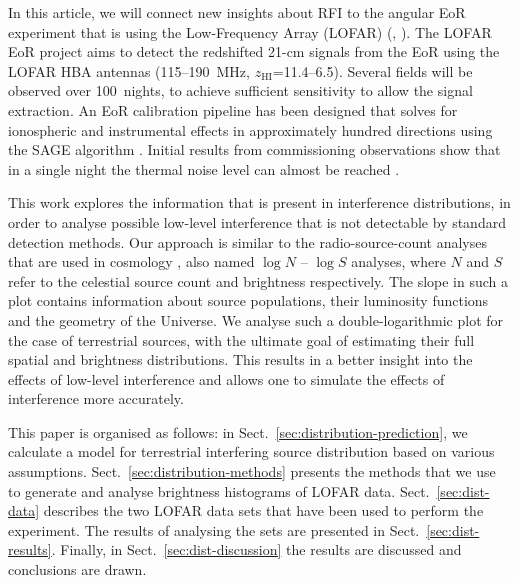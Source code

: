 \documentclass[useAMS,usenatbib]{mn2e}
\begin{document}
In this article, we will connect new insights about RFI to the angular EoR experiment that is using the Low-Frequency Array (LOFAR) (\citealt{de-bruyn-eor-ursi-2011}, \citealt{lofar-overview-2013}). The LOFAR EoR project aims to detect the redshifted 21-cm signals from the EoR using the LOFAR HBA antennas (115--190~MHz, $z_\textrm{HI}$=11.4--6.5). Several fields will be observed over 100~nights, to achieve sufficient sensitivity to allow the signal extraction. An EoR calibration pipeline has been designed that solves for ionospheric and instrumental effects in approximately hundred directions using the SAGE algorithm \citep{sage-calibration-ii}. Initial results from commissioning observations show that in a single night the thermal noise level can almost be reached \citep{ncp-eor-yatawatta}.

This work explores the information that is present in interference distributions, in order to analyse possible low-level interference that is not detectable by standard detection methods. Our approach is similar to the radio-source-count analyses that are used in cosmology \citep{condon-cosm-evol-of-radio-sources}, also named $\log N$ -- $\log S$ analyses, where $N$ and $S$ refer to the celestial source count and brightness respectively. The slope in such a plot contains information about source populations, their luminosity functions and the geometry of the Universe. We analyse such a double-logarithmic plot for the case of terrestrial sources, with the ultimate goal of estimating their full spatial and brightness distributions. This results in a better insight into the effects of low-level interference and allows one to simulate the effects of interference more accurately.


This paper is organised as follows: in Sect.~\ref{sec:distribution-prediction}, we calculate a model for terrestrial interfering source distribution based on various assumptions. Sect.~\ref{sec:distribution-methods} presents the methods that we use to generate and analyse brightness histograms of LOFAR data. Sect.~\ref{sec:dist-data} describes the two LOFAR data sets that have been used to perform the experiment. The results of analysing the sets are presented in Sect.~\ref{sec:dist-results}. Finally, in Sect.~\ref{sec:dist-discussion} the results are discussed and conclusions are drawn.
\end{document}
